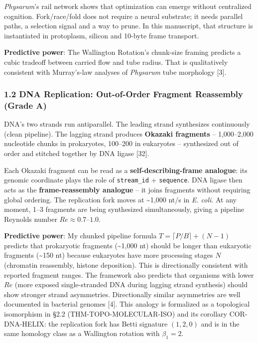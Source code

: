 \documentclass[
  11pt,
]{article}
\begin{document}
\emph{Physarum}'s rail network shows that optimization can emerge
without centralized cognition. Fork/race/fold does not require a neural
substrate; it needs parallel paths, a selection signal and a way to
prune. In this manuscript, that structure is instantiated in protoplasm,
silicon and 10-byte frame transport.

\textbf{Predictive power}: The Wallington Rotation's chunk-size framing
predicts a cubic tradeoff between carried flow and tube radius. That is
qualitatively consistent with Murray's-law analyses of \emph{Physarum}
tube morphology {[}3{]}.

\subsubsection{1.2 DNA Replication: Out-of-Order Fragment Reassembly
(Grade
A)}\label{dna-replication-out-of-order-fragment-reassembly-grade-a}

DNA's two strands run antiparallel. The leading strand synthesizes
continuously (clean pipeline). The lagging strand produces
\textbf{Okazaki fragments} -- 1,000--2,000 nucleotide chunks in
prokaryotes, 100--200 in eukaryotes -- synthesized out of order and
stitched together by DNA ligase {[}32{]}.

Each Okazaki fragment can be read as a \textbf{self-describing-frame
analogue}: its genomic coordinate plays the role of \texttt{stream\_id}
+ \texttt{sequence}. DNA ligase then acts as the
\textbf{frame-reassembly analogue} -- it joins fragments without
requiring global ordering. The replication fork moves at
\textasciitilde1,000 nt/s in \emph{E. coli}. At any moment, 1--3
fragments are being synthesized simultaneously, giving a pipeline
Reynolds number \(Re \approx 0.7\)--\(1.0\).

\textbf{Predictive power}: My chunked pipeline formula
\(T = \lceil P/B \rceil + (N - 1)\) predicts that prokaryotic fragments
(\textasciitilde1,000 nt) should be longer than eukaryotic fragments
(\textasciitilde150 nt) because eukaryotes have more processing stages
\(N\) (chromatin reassembly, histone deposition). This is directionally
consistent with reported fragment ranges. The framework also predicts
that organisms with lower \(Re\) (more exposed single-stranded DNA
during lagging strand synthesis) should show stronger strand
asymmetries. Directionally similar asymmetries are well documented in
bacterial genomes {[}4{]}. This analogy is formalized as a topological
isomorphism in §2.2 (THM-TOPO-MOLECULAR-ISO) and its corollary
COR-DNA-HELIX: the replication fork has Betti signature \((1, 2, 0)\)
and is in the same homology class as a Wallington rotation with
\(\beta_1 = 2\).
\end{document}
